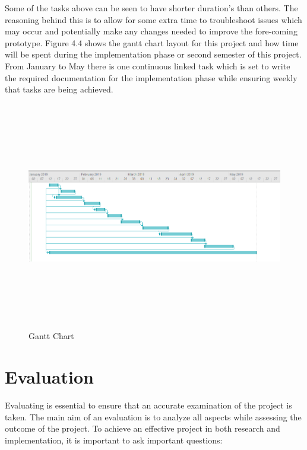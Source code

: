 \vspace{10mm}

Some of the tasks above can be seen to have shorter duration's than others. The reasoning behind this is to allow for some extra time to troubleshoot issues which may occur and potentially make any changes needed to improve the fore-coming prototype. Figure 4.4 shows the gantt chart layout for this project and how time will be spent during the implementation phase or second semester of this project. From January to May there is one continuous linked task which is set to write the required documentation for the implementation phase while ensuring weekly that tasks are being achieved. 
\pagebreak

\begin{figure}[ht]
    \centering
     \includegraphics[width=1.0\textwidth, height=10cm]{Figures/GanttChart.PNG}
  \caption[Gantt Chart]{Gantt Chart \cite{Reference19}}
 \label{fig: Gantt Chart}
\end{figure}


\section{Evaluation}
Evaluating is essential to ensure that an accurate examination of the project is taken. The main aim of an evaluation is to analyze all aspects while assessing the outcome of the project. To achieve an effective project in both research and implementation, it is important to ask important questions:

